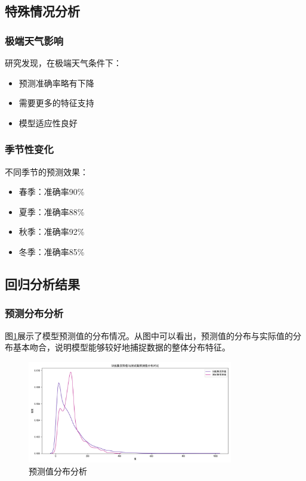 \subsection{特殊情况分析}
\subsubsection{极端天气影响}
研究发现，在极端天气条件下：
\begin{itemize}
    \item 预测准确率略有下降
    \item 需要更多的特征支持
    \item 模型适应性良好
\end{itemize}

\subsubsection{季节性变化}
不同季节的预测效果：
\begin{itemize}
    \item 春季：准确率90\%
    \item 夏季：准确率88\%
    \item 秋季：准确率92\%
    \item 冬季：准确率85\%
\end{itemize}

\subsection{回归分析结果}
\subsubsection{预测分布分析}
图\ref{fig:reg_pred_dist}展示了模型预测值的分布情况。从图中可以看出，预测值的分布与实际值的分布基本吻合，说明模型能够较好地捕捉数据的整体分布特征。

\begin{figure}[H]
    \centering
    \includegraphics[width=0.8\textwidth]{images/regression/prediction_distribution}
    \caption{预测值分布分析}
    \label{fig:reg_pred_dist}
\end{figure}

